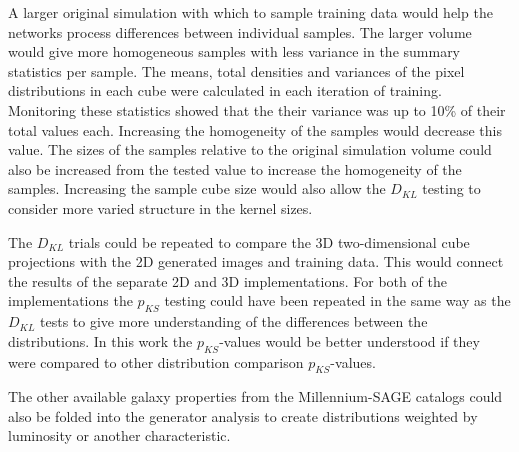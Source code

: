 \documentclass[twocolumn]{article}
\numberwithin{equation}{section}
\begin{document}
A larger original simulation with which to sample training data would help the networks process differences between 
individual samples. The larger volume would give more homogeneous samples with less variance in the summary statistics 
per sample. The means, total densities and variances of the pixel distributions in each cube were calculated in each 
iteration of training. Monitoring these statistics showed that the their variance was up to 10\% of their total values 
each. Increasing the homogeneity of the samples would decrease this value. The sizes of the samples relative to the 
original simulation volume could also be increased from the tested value to increase the homogeneity of the samples. 
Increasing the sample cube size would also allow the $D_{KL}$ testing to consider more varied structure in the kernel 
sizes. 

The $D_{KL}$ trials could be repeated to compare the 3D two-dimensional cube projections with the 2D generated images 
and training data. This would connect the results of the separate 2D and 3D implementations. For both of the 
implementations the $p_{KS}$ testing could have been repeated in the same way as the $D_{KL}$ tests to give more 
understanding of the differences between the distributions. In this work the $p_{KS}$-values would be better understood
if they were compared to other distribution comparison $p_{KS}$-values.

The other available galaxy properties from the Millennium-SAGE catalogs could also be folded into the generator analysis
to create distributions weighted by luminosity or another characteristic. 

\end{document}
